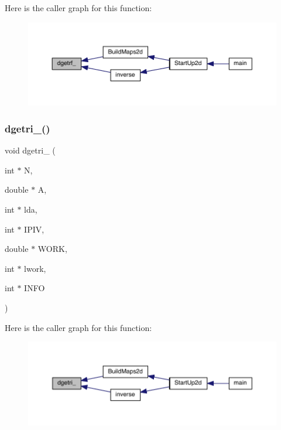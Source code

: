 Here is the caller graph for this function\+:\nopagebreak
\begin{figure}[H]
\begin{center}
\leavevmode
\includegraphics[width=350pt]{a00596_a9ade98d71580bb70e0ddf663d30e4bb4_icgraph}
\end{center}
\end{figure}
\mbox{\label{a00596_af83709f5dcd4b9fbff71c3623b64fa21}} 
\subsubsection{\texorpdfstring{dgetri\+\_\+()}{dgetri\_()}}
{\footnotesize\ttfamily void dgetri\+\_\+ (\begin{DoxyParamCaption}\item[{int $\ast$}]{N,  }\item[{double $\ast$}]{A,  }\item[{int $\ast$}]{lda,  }\item[{int $\ast$}]{I\+P\+IV,  }\item[{double $\ast$}]{W\+O\+RK,  }\item[{int $\ast$}]{lwork,  }\item[{int $\ast$}]{I\+N\+FO }\end{DoxyParamCaption})}

Here is the caller graph for this function\+:\nopagebreak
\begin{figure}[H]
\begin{center}
\leavevmode
\includegraphics[width=350pt]{a00596_af83709f5dcd4b9fbff71c3623b64fa21_icgraph}
\end{center}
\end{figure}
\mbox{\label{a00596_ad2387c52fae7bf66e1511ef9a281ee26}} 
